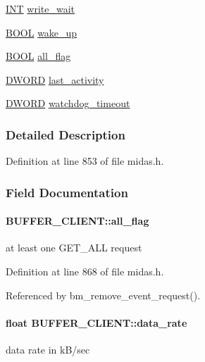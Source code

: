 \begin{DoxyCompactItemize}
\item 
\hyperlink{vppg_8h_a392e62da233ed3e2f7c3fd4f487a3896}{INT} \hyperlink{structBUFFER__CLIENT_a884b0a6395661ef9f711fa3ca7bc19b6}{write\_\-wait}
\item 
\hyperlink{vt2_8h_a239c7f0d40651c3e419c5b9651507d14}{BOOL} \hyperlink{structBUFFER__CLIENT_ab7cd08686cbc2ba474a623bffc174ac7}{wake\_\-up}
\item 
\hyperlink{vt2_8h_a239c7f0d40651c3e419c5b9651507d14}{BOOL} \hyperlink{structBUFFER__CLIENT_aaecb6333b24063b91eb403a11aa4ea53}{all\_\-flag}
\item 
\hyperlink{vt2_8h_a798af1e30bc65f319c1a246cecf59e39}{DWORD} \hyperlink{structBUFFER__CLIENT_a90d5bebe80eaf1d76dd2c97d54796efd}{last\_\-activity}
\item 
\hyperlink{vt2_8h_a798af1e30bc65f319c1a246cecf59e39}{DWORD} \hyperlink{structBUFFER__CLIENT_a7f9617db2284469ad91a33d3f3ae1447}{watchdog\_\-timeout}
\end{DoxyCompactItemize}


\subsubsection{Detailed Description}


Definition at line 853 of file midas.h.

\subsubsection{Field Documentation}
\paragraph[{all\_\-flag}]{ {\bf BUFFER\_\-CLIENT::all\_\-flag}}\hfill\label{structBUFFER__CLIENT_aaecb6333b24063b91eb403a11aa4ea53}
at least one GET\_\-ALL request 

Definition at line 868 of file midas.h.

Referenced by bm\_\-remove\_\-event\_\-request().
\paragraph[{data\_\-rate}]{\setlength{\rightskip}{0pt plus 5cm}float {\bf BUFFER\_\-CLIENT::data\_\-rate}}\hfill\label{structBUFFER__CLIENT_aab8057a2018cd46205253446a4e7cd3a}
data rate in kB/sec 


